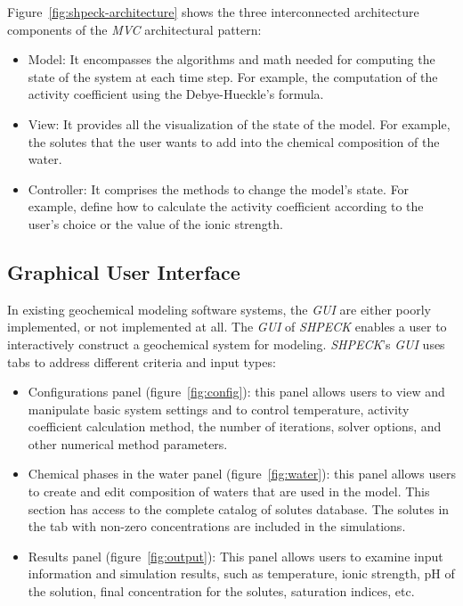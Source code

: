 \documentclass[preprint,12pt,3p]{elsarticle}
\begin{document}
Figure~\ref{fig:shpeck-architecture} shows the three interconnected architecture components of the \emph{MVC} architectural pattern:		
\begin{itemize}		
\item Model: It encompasses the algorithms and math needed for computing the state of the system at each time step. For example, the computation of the activity coefficient using the Debye-Hueckle's formula. 
\item View: It provides all the visualization of the state of the model. For example, the solutes that the user wants to add into the chemical composition of the water.		
\item Controller: It comprises the methods to change the model's state. For example, define how to calculate the activity coefficient according to the user's choice or the value of the ionic strength.		\end{itemize}

\subsection{Graphical User Interface}
In existing geochemical modeling software systems, the \emph{GUI} are either poorly implemented, or not implemented at all. The \emph{GUI} of \emph{SHPECK} enables a user to interactively construct a geochemical system for modeling. \emph{SHPECK}'s \emph{GUI} uses tabs to address different criteria and input types:
\begin{itemize}
\item Configurations panel (figure~\ref{fig:config}): this panel allows users to view and manipulate basic system settings and to control temperature, activity coefficient calculation method, the number of iterations, solver options, and other numerical method parameters.
\item Chemical phases in the water panel (figure~\ref{fig:water}): this panel allows users to create and edit composition of waters that are used in the model. This section has access to the complete catalog of solutes database. The solutes in the tab with non-zero concentrations are included in the simulations. 
\item Results panel (figure~\ref{fig:output}): This panel allows users to examine input information and simulation results, such as temperature, ionic strength, pH of the solution, final concentration for the solutes, saturation indices, etc.
\end{itemize}
\end{document}
